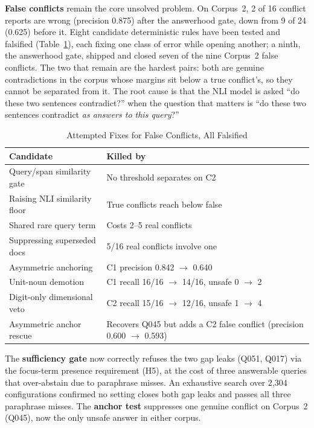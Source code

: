 \documentclass[conference]{IEEEtran}
\begin{document}
\textbf{False conflicts} remain the core unsolved problem. On Corpus~2,
2 of 16 conflict reports are wrong (precision 0.875) after the answerhood
gate, down from 9 of 24 (0.625) before it. Eight candidate deterministic
rules have been tested and falsified (Table~\ref{tab:failed_fixes}), each
fixing one class of error while opening another; a ninth, the answerhood
gate, shipped and closed seven of the nine Corpus~2 false conflicts. The two
that remain are the hardest pairs: both are genuine contradictions in the
corpus whose margins sit below a true conflict's, so they cannot be
separated from it. The root cause is that the NLI model is asked ``do
these two sentences contradict?'' when the question that matters is
``do these two sentences contradict \textit{as answers to this
query}?''

\begin{table}[htbp]
\caption{Attempted Fixes for False Conflicts, All Falsified}
\label{tab:failed_fixes}
\centering
\small
\begin{tabularx}{\columnwidth}{@{}l X@{}}
\toprule
Candidate & Killed by \\
\midrule
Query/span similarity gate & No threshold separates on C2 \\
Raising NLI similarity floor & True conflicts reach below false \\
Shared rare query term & Costs 2--5 real conflicts \\
Suppressing superseded docs & 5/16 real conflicts involve one \\
Asymmetric anchoring & C1 precision 0.842 $\to$ 0.640 \\
Unit-noun demotion & C1 recall 16/16 $\to$ 14/16, unsafe 0 $\to$ 2 \\
Digit-only dimensional veto & C2 recall 15/16 $\to$ 12/16, unsafe 1 $\to$ 4 \\
Asymmetric anchor rescue & Recovers Q045 but adds a C2 false conflict (precision 0.600 $\to$ 0.593) \\
\bottomrule
\end{tabularx}
\end{table}

The \textbf{sufficiency gate} now correctly refuses the two gap leaks
(Q051, Q017) via the focus-term presence requirement (H5), at the cost
of three answerable queries that over-abstain due to paraphrase misses.
An exhaustive search over 2{,}304 configurations confirmed no setting
closes both gap leaks and passes all three paraphrase misses. The
\textbf{anchor test} suppresses one genuine conflict on Corpus~2
(Q045), now the only unsafe answer in either corpus.
\end{document}
